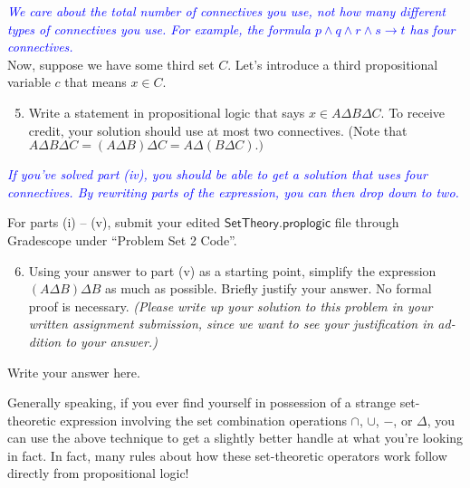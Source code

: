 \documentclass{article}
\renewcommand{\(}{\left(}
\renewcommand{\)}{\right)}
\theoremstyle{plain}
\theoremstyle{plain}
\theoremstyle{definition}
\newcommand{\annotate}[1]{\textit{\textcolor{blue}{#1}}}
\begin{document}
\annotate{We care about the total number of connectives you use, not how many different types of connectives you use. For example, the formula $p \land q \land r \land s \rightarrow t$ has four connectives.}\\

Now, suppose we have some third set $C$. Let's introduce a third propositional
variable $c$ that means $x \in C$.

\begin{enumerate}[label*=\roman*.,ref=\roman*]
  \setcounter{enumi}{4}
  \item Write a statement in propositional logic that says $x \in A \Delta B \Delta C$. To receive credit, your solution should use at most two connectives. (Note that $A \Delta B \Delta C = (A \Delta B) \Delta C = A \Delta (B \Delta C).)$
  
\end{enumerate}

\annotate{If you've solved part (iv), you should be able to get a solution that uses four connectives. By rewriting parts of the expression, you can then drop down to two.}

\begin{shaded}
  For parts (i) -- (v), submit your edited $\mathsf{SetTheory.proplogic}$ file
  through Gradescope under ``Problem Set 2 Code''.
\end{shaded}



\begin{enumerate}[label*=\roman*.,ref=\roman*]
\setcounter{enumi}{5}
  \item Using your answer to part (v) as a starting point, simplify the
    expression $(A \Delta B) \Delta B$ as much as possible. Briefly justify your
    answer. No formal proof is necessary. \textit{(Please write up your solution
    to this problem in your written assignment submission, since we want to see
    your justification in ad- dition to your answer.)}
\end{enumerate}
\begin{shaded}
  Write your answer here.
\end{shaded}

Generally speaking, if you ever find yourself in possession of a strange
set-theoretic expression involving the set combination operations $\cap$,
$\cup$, $-$, or $\Delta$, you can use the above technique to get a slightly
better handle at what you're looking in fact. In fact, many rules about how
these set-theoretic operators work follow directly from propositional logic! \\
\end{document}
